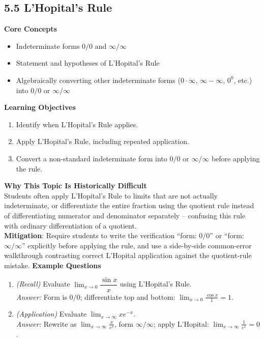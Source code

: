 \documentclass[11pt]{article}
\begin{document}
\subsection{5.5 L'Hopital's Rule}
\textbf{Core Concepts}
\begin{itemize}
\item Indeterminate forms $0/0$ and $\infty/\infty$
\item Statement and hypotheses of L'Hopital's Rule
\item Algebraically converting other indeterminate forms ($0\cdot\infty$, $\infty-\infty$, $0^0$, etc.) into $0/0$ or $\infty/\infty$
\end{itemize}
\textbf{Learning Objectives}
\begin{enumerate}
\item Identify when L'Hopital's Rule applies.
\item Apply L'Hopital's Rule, including repeated application.
\item Convert a non-standard indeterminate form into $0/0$ or $\infty/\infty$ before applying the rule.
\end{enumerate}
\textbf{Why This Topic Is Historically Difficult} \\
Students often apply L'Hopital's Rule to limits that are not actually indeterminate, or differentiate the entire fraction using the quotient rule instead of differentiating numerator and denominator separately -- confusing this rule with ordinary differentiation of a quotient. \\
\textbf{Mitigation}: Require students to write the verification ``form: $0/0$'' or ``form: $\infty/\infty$'' explicitly before applying the rule, and use a side-by-side common-error walkthrough contrasting correct L'Hopital application against the quotient-rule mistake.
\textbf{Example Questions}
\begin{enumerate}
\item \emph{(Recall)} Evaluate $\displaystyle\lim_{x\to 0}\dfrac{\sin x}{x}$ using L'Hopital's Rule. \\
\textit{Answer:} Form is $0/0$; differentiate top and bottom: $\lim_{x\to0}\frac{\cos x}{1}=1$.
\item \emph{(Application)} Evaluate $\displaystyle\lim_{x\to\infty} x e^{-x}$. \\
\textit{Answer:} Rewrite as $\lim_{x\to\infty}\frac{x}{e^{x}}$, form $\infty/\infty$; apply L'Hopital: $\lim_{x\to\infty}\frac{1}{e^x}=0$.
\end{enumerate}
\end{document}
